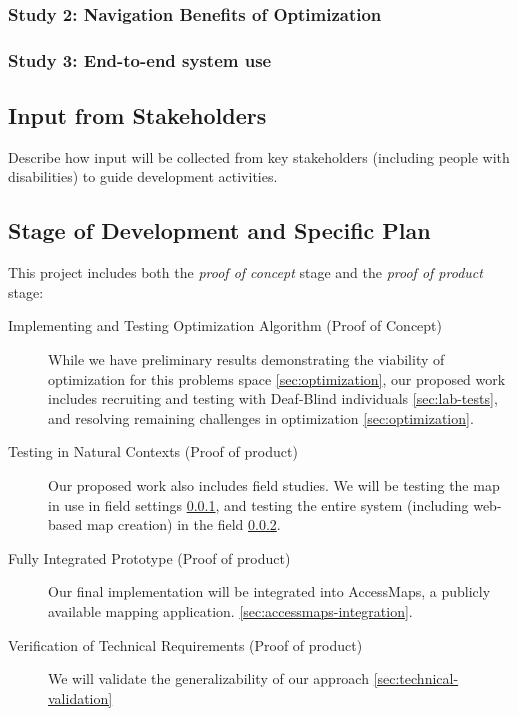 \subsubsection{Study 2: Navigation Benefits of Optimization}
\label{sec:field-map}

\subsubsection{Study 3: End-to-end system use}
\label{sec:field-web}

\subsection{Input from Stakeholders}
Describe how input will be collected from key stakeholders (including people with disabilities) to guide development activities.

\subsection{Stage of Development and Specific Plan}

This project includes both the \textit{proof of concept} stage and the \textit{proof of product} stage:
\begin{description}
\item[Implementing and Testing Optimization Algorithm (Proof of Concept)] While we have preliminary results demonstrating the viability of optimization for this problems space \ref{sec:optimization}, our proposed work includes recruiting and testing with Deaf-Blind individuals \ref{sec:lab-tests}, and resolving remaining challenges in optimization \ref{sec:optimization}.
\item[Testing in Natural Contexts (Proof of product)] Our proposed work also includes field studies. We will be testing the map in use in field settings \ref{sec:field-map}, and testing the entire system (including web-based map creation) in the field \ref{sec:field-web}. 
\item[Fully Integrated Prototype (Proof of product)]
Our final implementation will be integrated into AccessMaps, a publicly available mapping application. \ref{sec:accessmaps-integration}.
\item[Verification of Technical Requirements (Proof of product)]
We will validate the generalizability of our approach  \ref{sec:technical-validation}
\end{description}
    
